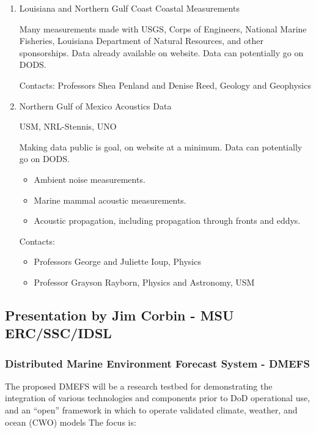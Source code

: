 \begin{enumerate}
\item Louisiana and Northern Gulf Coast Coastal Measurements

Many measurements made with USGS, Corps of Engineers, National Marine Fisheries, 
Louisiana Department of Natural Resources, and other sponsorships.  Data already available on 
website.  Data can potentially go on DODS. 

Contacts:  Professors Shea Penland and Denise Reed, Geology and Geophysics
        
\item Northern Gulf of Mexico Acoustics Data

USM, NRL-Stennis, UNO

Making data public is goal, on website at a minimum.  Data can potentially go on DODS.  

\begin{itemize}
\item  Ambient noise measurements.
\item Marine mammal acoustic measurements.
\item Acoustic propagation, including propagation through fronts and eddys.
\end{itemize}

Contacts: \begin{itemize}

\item  Professors George and Juliette Ioup, Physics
\item Professor Grayson Rayborn, Physics and Astronomy, USM
\end{itemize}
\end{enumerate}

\subsection{Presentation by Jim Corbin - MSU ERC/SSC/IDSL}

\subsubsection{Distributed Marine Environment Forecast System - DMEFS}

The proposed DMEFS will be a research testbed for demonstrating the
integration of various technologies and components prior to DoD
operational use, and an ``open'' framework in which to operate
validated climate, weather, and ocean (CWO) models The focus is:


